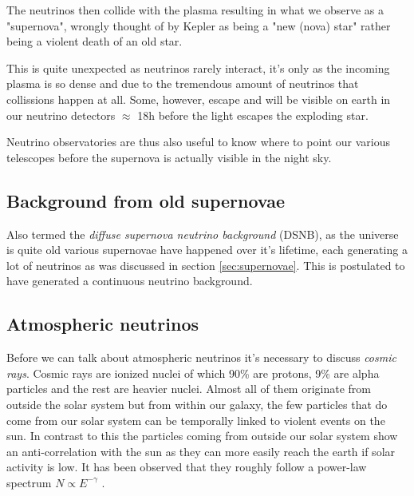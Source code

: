 \documentclass[11pt,a4paper,faculty=we,language=en,doctype=report]{cls/ugent-doc}
\begin{document}
The neutrinos then collide with the plasma resulting in what we observe as a
"supernova", wrongly thought of by Kepler as being a "new (nova) star" rather
being a violent death of an old star.

This is quite unexpected as neutrinos rarely interact, it's only as the
incoming plasma is so dense and due to the tremendous amount of neutrinos that
collissions happen at all. Some, however, escape and will be visible on earth
in our neutrino detectors $\approx$ 18h before the light escapes the exploding
star.

Neutrino observatories are thus also useful to know where to point our various
telescopes before the supernova is actually visible in the night sky.
\subsection{Background from old supernovae}
Also termed the \textit{diffuse supernova neutrino background} (DSNB), as the
universe is quite old various supernovae have happened over it's lifetime, each generating
a lot of neutrinos as was discussed in section \ref{sec:supernovae}. 
This is postulated to have generated a continuous neutrino background.
\subsection{Atmospheric neutrinos}
\label{sec:AtmosphericNeutrinos}
Before we can talk about atmospheric neutrinos it's necessary to discuss \textit{cosmic rays}.
Cosmic rays are ionized nuclei of which 90\% are protons, 9\% are alpha particles and
the rest are heavier nuclei. Almost all of them originate from outside the solar system but
from within our galaxy, the few particles that do come from our solar system can be temporally
linked to violent events on the sun. In contrast to this the particles coming from outside
our solar system show an anti-correlation with the sun as they can more easily reach the earth
if solar activity is low.
It has been observed that they roughly follow a power-law spectrum 
$N \propto E^{-\gamma}$ \cite{gaisser_engel_resconi_2016}.
\end{document}
